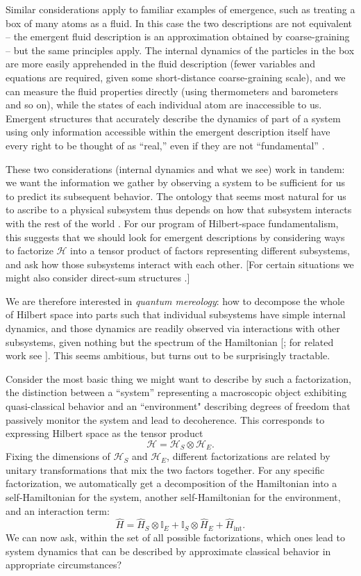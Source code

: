 \documentclass[12pt,english]{article}
\newcommand{\be}{\begin{equation}}
\newcommand{\ee}{\end{equation}}
\newcommand{\ham}{\hat{H}}
\newcommand{\HH}{\mathcal{H}}
\begin{document}
Similar considerations apply to familiar examples of emergence, such as treating a box of many atoms as a fluid.
In this case the two descriptions are not equivalent -- the emergent fluid description is an approximation obtained by coarse-graining -- but the same principles apply.
The internal dynamics of the particles in the box are more easily apprehended in the fluid description (fewer variables and equations are required, given some short-distance coarse-graining scale), and we can measure the fluid properties directly (using thermometers and barometers and so on), while the states of each individual atom are inaccessible to us.
Emergent structures that accurately describe the dynamics of part of a system using only information accessible within the emergent description itself have every right to be thought of as ``real,'' even if they are not ``fundamental'' \citep{dennett1991real,wallace2012emergent}.

These two considerations (internal dynamics and what we see) work in tandem: we want the information we gather by observing a system to be sufficient for us to predict its subsequent behavior.
The ontology that seems most natural for us to ascribe to a physical subsystem thus depends on how that subsystem interacts with the rest of the world \citep{Zanardi:2004zz}.
For our program of Hilbert-space fundamentalism, this suggests that we should look for emergent descriptions by considering ways to factorize $\HH$ into a tensor product of factors representing different subsystems, and ask how those subsystems interact with each other.
[For certain situations we might also consider direct-sum structures \citep{Kabernik:2019jko}.]

We are therefore interested in \emph{quantum mereology}: how to decompose the whole of Hilbert space into parts such that individual subsystems have simple internal dynamics, and those dynamics are readily observed via interactions with other subsystems, given nothing but the spectrum of the Hamiltonian [\citep{Carroll:2018rhc}; for related work see \citep{brun1999classical,Hartle:2008mv,Tegmark:2014kka,Ney2020-NEYFTW}].
This seems ambitious, but turns out to be surprisingly tractable.

Consider the most basic thing we might want to describe by such a factorization, the distinction between a ``system''  representing a macroscopic object exhibiting quasi-classical behavior and an ``environment" describing degrees of freedom that passively monitor the system and lead to decoherence.
This corresponds to expressing Hilbert space as the tensor product
\be
  \HH = \HH_S \otimes \HH_E.
\ee
Fixing the dimensions of $\HH_S$ and $\HH_E$, different factorizations are related by unitary transformations that mix the two factors together.
For any specific factorization, we automatically get a decomposition of the Hamiltonian into a self-Hamiltonian for the system, another self-Hamiltonian for the environment, and an interaction term:
\be
  \ham = \ham_S \otimes \mathbb{I}_E + \mathbb{I}_S \otimes \ham_E + \ham_\mathrm{int}.
\ee
We can now ask, within the set of all possible factorizations, which ones lead to system dynamics that can be described by approximate classical behavior in appropriate circumstances?
\end{document}
